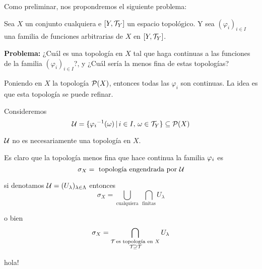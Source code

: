 Como preliminar, nos propondremos el siguiente problema:

Sea $X$ un conjunto cualquiera e $[Y, \TAU[Y] ]$ un espacio topológico. Y sea $(\varphi_{i})_{i \in I}$ una familia de funciones arbitrarias de $X$ en $[Y, \TAU[Y] ]$.

\textbf{Problema:} ¿Cuál es una topología en $X$ tal que haga continuas a las funciones de la familia $(\varphi_{i})_{i \in I}$?, y ¿Cuál sería la menos fina de estas topologías?

Poniendo en $X$ la topología $\cp(X)$, entonces todas las $\varphi_{i}$ son continuas. La idea es que esta topología se puede refinar.

Consideremos $$
\cu = \{ 
{\PHI[i]}^{-1} (\omega) \,|\, i \in I,\, \omega \in \TAU[Y]
\} \subseteq \cp (X)
$$

$\cu$ no es necesariamente una topología en $X$.

Es claro que la topología menos fina que hace continua la familia $\PHI[i]$ es $$
\sigma_X = \text{ topología engendrada por $\cu$}
$$

si denotamos $\cu = (U_{\lambda})_{\lambda \in \Lambda}$ entonces $$
\sigma_{X} 
= \bigcup_{\text{cualquiera}} \ \bigcap_{\text{finitas}} U_{\lambda}
$$

o bien $$
\sigma_{X} 
= \bigcap_{
\begin{subarray}{c}
\TAU \text{ es topología en } X \\ \TAU \supseteq \TAU
\end{subarray}
} U_{\lambda}
$$

hola!